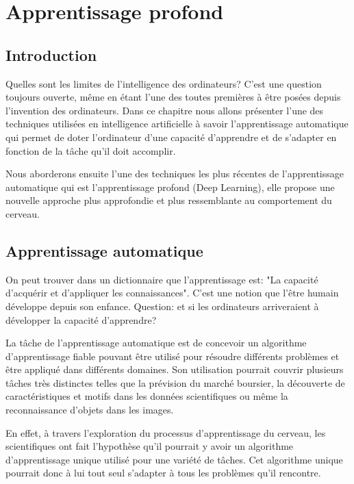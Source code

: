 
\chapter{Apprentissage profond}



\section{Introduction}

	Quelles sont les limites de l'intelligence des ordinateurs? C'est une question toujours ouverte, même en étant l'une des toutes premières à être posées depuis l'invention des ordinateurs. Dans ce chapitre nous allons présenter l'une des techniques utilisées en intelligence artificielle à savoir l'apprentissage automatique qui permet de doter l'ordinateur d'une capacité d'apprendre et de s'adapter en fonction de la tâche qu'il doit accomplir.
	
	Nous aborderons ensuite l'une des techniques les plus récentes de l'apprentissage automatique qui est l'apprentissage profond (Deep Learning), elle propose une nouvelle approche plus approfondie et plus ressemblante au comportement du cerveau.


\section{Apprentissage automatique}

	On peut trouver dans un dictionnaire que l'apprentissage est: "La capacité d'acquérir et d'appliquer les connaissances". C'est une notion que l'être humain développe depuis son enfance. Question: et si les ordinateurs arriveraient à développer la capacité d'apprendre?

	La tâche de l'apprentissage automatique est de concevoir un algorithme d'apprentissage fiable pouvant être utilisé pour résoudre différents problèmes et être appliqué dans différents domaines. Son utilisation pourrait couvrir plusieurs tâches très distinctes telles que la prévision du marché boursier, la découverte de caractéristiques et motifs dans les données scientifiques ou même la reconnaissance d'objets dans les images.

	En effet, à travers l'exploration du processus d'apprentissage du cerveau, les scientifiques ont fait l'hypothèse qu'il pourrait y avoir un algorithme d'apprentissage unique utilisé pour une variété de tâches. Cet algorithme unique pourrait donc à lui tout seul s'adapter à tous les problèmes qu'il rencontre. 


